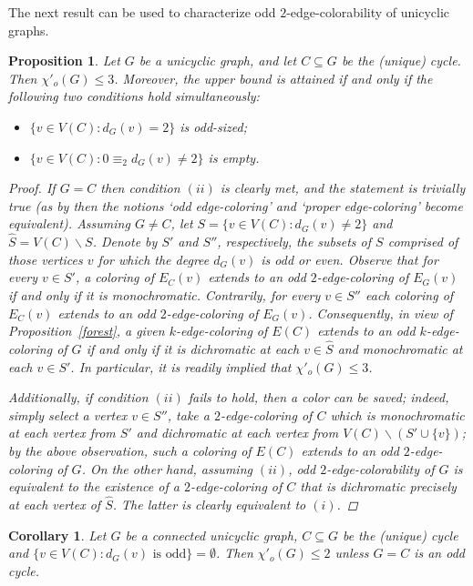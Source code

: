 \documentclass[a4paper,12pt]{article}
\newtheorem{corollary}[theorem]{Corollary}
\newtheorem{proposition}[theorem]{Proposition}
\numberwithin{equation}{section}
\begin{document}
The next result can be used to characterize odd $2$-edge-colorability of unicyclic graphs.

\begin{proposition}
Let $G$ be a unicyclic graph, and let $C\subseteq G$ be the (unique) cycle. Then $\chi'_o(G)\leq3$. Moreover, the upper bound is attained if and only if the following two conditions hold simultaneously:
\begin{itemize}
\item[$(i)$] $\{v\in V(C):d_G(v)=2\}$ is odd-sized;
\item[$(ii)$] $\{v\in V(C):0\equiv_2d_G(v)\neq2 \}$ is empty.
\end{itemize}
\begin{proof}
If $G=C$ then condition $(ii)$ is clearly met, and the statement is trivially true (as by then the notions `odd edge-coloring'  and `proper edge-coloring' become equivalent). Assuming $G\neq C$, let $S=\{v\in V(C):d_G(v)\neq2\}$ and $\hat{S}=V(C)\backslash S$. Denote by $S'$ and $S''$, respectively, the subsets of $S$ comprised of those vertices $v$ for which the degree $d_G(v)$ is odd or even. Observe that for every $v\in S'$, a coloring of $E_C(v)$ extends to an odd $2$-edge-coloring of $E_G(v)$ if and only if it is monochromatic. Contrarily, for every $v\in S''$ each coloring of $E_C(v)$ extends to an odd $2$-edge-coloring of $E_G(v)$. Consequently, in view of Proposition~\ref{forest}, a given $k$-edge-coloring of $E(C)$ extends to an odd $k$-edge-coloring of $G$ if and only if it is dichromatic at each $v\in \hat{S}$ and monochromatic at each $v\in S'$. In particular, it is readily implied that $\chi'_o(G)\leq3$.

Additionally, if condition $(ii)$ fails to hold, then a color can be saved; indeed, simply select a vertex $v\in S''$, take a $2$-edge-coloring of $C$ which is monochromatic at each vertex from $S'$ and dichromatic at each vertex from  $V(C)\backslash (S'\cup \{v\})$; by the above observation, such a coloring of $E(C)$ extends to an odd $2$-edge-coloring of $G$. On the other hand, assuming $(ii)$, odd $2$-edge-colorability of $G$ is equivalent to the existence of a $2$-edge-coloring of $C$ that is dichromatic precisely at each vertex of $\hat{S}$. The latter is clearly equivalent to $(i)$.
\end{proof}
\end{proposition}
\begin{corollary}
    \label{unicycle}
Let $G$ be a connected unicyclic graph, $C\subseteq G$ be the (unique) cycle and $\{v\in V(C):d_G(v) \text{ is odd}\}=\emptyset$. Then $\chi'_o(G)\leq2$ unless $G=C$ is an odd cycle.
\end{corollary}
\end{document}

